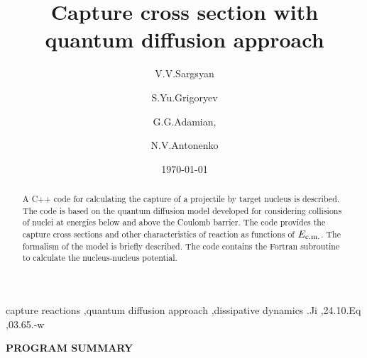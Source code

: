 \documentclass[preprint,review,12pt]{elsarticle}
\begin{document}
\begin{frontmatter}

  \title{Capture cross section with quantum diffusion approach}

  \author[a,b]{V.V.Sargsyan}
  \author[a]{S.Yu.Grigoryev  }
  \author[a]{G.G.Adamian, }
  \author[a]{N.V.Antonenko}


  \address[a]{Joint Institute for Nuclear Research, 141980 Dubna, Russia}
  \address[b]{Institut f\"ur Theoretische Physik der Justus--Liebig--Universit\" at, D--35392 Giessen, Germany}

  \date{\today}

  \begin{abstract}
  A C++ code for calculating the capture of a projectile by target nucleus is
  described.  The code is based on the quantum diffusion model developed for
  considering collisions of nuclei at energies below and above the Coulomb barrier.
  The code provides the capture cross sections and other characteristics of reaction as functions
  of $E_{\rm c.m.}$. The formalism of the model is briefly described.
  The code contains the Fortran subroutine to calculate the nucleus-nucleus potential.

  \end{abstract}


  \begin{keyword}
  capture reactions \sep quantum diffusion approach \sep dissipative dynamics
  .Ji \sep 24.10.Eq \sep 03.65.-w

  \end{keyword}

\end{frontmatter}

{\bf\large PROGRAM SUMMARY}
\end{document}

